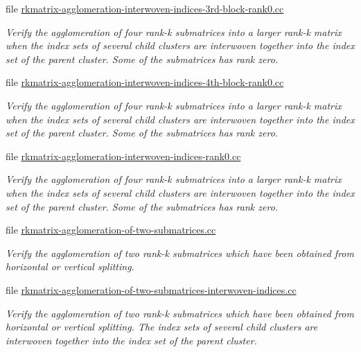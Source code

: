 \begin{DoxyCompactItemize}
file \hyperlink{rkmatrix-agglomeration-interwoven-indices-3rd-block-rank0_8cc}{rkmatrix-\/agglomeration-\/interwoven-\/indices-\/3rd-\/block-\/rank0.\+cc}
\begin{DoxyCompactList}\small\item\em Verify the agglomeration of four rank-\/k submatrices into a larger rank-\/k matrix when the index sets of several child clusters are interwoven together into the index set of the parent cluster. Some of the submatrices has rank zero. \end{DoxyCompactList}\item 
file \hyperlink{rkmatrix-agglomeration-interwoven-indices-4th-block-rank0_8cc}{rkmatrix-\/agglomeration-\/interwoven-\/indices-\/4th-\/block-\/rank0.\+cc}
\begin{DoxyCompactList}\small\item\em Verify the agglomeration of four rank-\/k submatrices into a larger rank-\/k matrix when the index sets of several child clusters are interwoven together into the index set of the parent cluster. Some of the submatrices has rank zero. \end{DoxyCompactList}\item 
file \hyperlink{rkmatrix-agglomeration-interwoven-indices-rank0_8cc}{rkmatrix-\/agglomeration-\/interwoven-\/indices-\/rank0.\+cc}
\begin{DoxyCompactList}\small\item\em Verify the agglomeration of four rank-\/k submatrices into a larger rank-\/k matrix when the index sets of several child clusters are interwoven together into the index set of the parent cluster. Some of the submatrices has rank zero. \end{DoxyCompactList}\item 
file \hyperlink{rkmatrix-agglomeration-of-two-submatrices_8cc}{rkmatrix-\/agglomeration-\/of-\/two-\/submatrices.\+cc}
\begin{DoxyCompactList}\small\item\em Verify the agglomeration of two rank-\/k submatrices which have been obtained from horizontal or vertical splitting. \end{DoxyCompactList}\item 
file \hyperlink{rkmatrix-agglomeration-of-two-submatrices-interwoven-indices_8cc}{rkmatrix-\/agglomeration-\/of-\/two-\/submatrices-\/interwoven-\/indices.\+cc}
\begin{DoxyCompactList}\small\item\em Verify the agglomeration of two rank-\/k submatrices which have been obtained from horizontal or vertical splitting. The index sets of several child clusters are interwoven together into the index set of the parent cluster. \end{DoxyCompactList}\item 

\end{DoxyCompactItemize}
